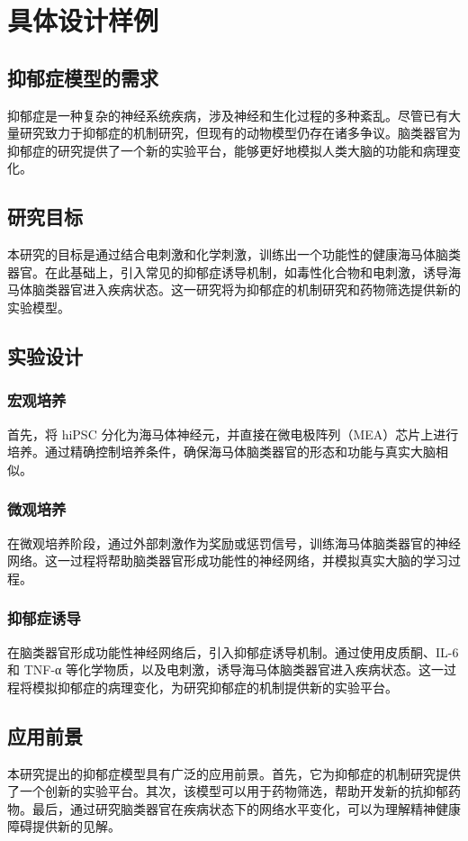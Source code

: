 \chapter{具体设计样例}\label{chap:design}

\section{抑郁症模型的需求}\label{sec:depression-model-requirement}
抑郁症是一种复杂的神经系统疾病，涉及神经和生化过程的多种紊乱。尽管已有大量研究致力于抑郁症的机制研究，但现有的动物模型仍存在诸多争议。脑类器官为抑郁症的研究提供了一个新的实验平台，能够更好地模拟人类大脑的功能和病理变化。

\section{研究目标}\label{sec:research-objective}
本研究的目标是通过结合电刺激和化学刺激，训练出一个功能性的健康海马体脑类器官。在此基础上，引入常见的抑郁症诱导机制，如毒性化合物和电刺激，诱导海马体脑类器官进入疾病状态。这一研究将为抑郁症的机制研究和药物筛选提供新的实验模型。

\section{实验设计}\label{sec:experiment-design}
\subsection{宏观培养}\label{subsec:macro-culture}
首先，将 hiPSC 分化为海马体神经元，并直接在微电极阵列（MEA）芯片上进行培养。通过精确控制培养条件，确保海马体脑类器官的形态和功能与真实大脑相似。

\subsection{微观培养}\label{subsec:micro-culture}
在微观培养阶段，通过外部刺激作为奖励或惩罚信号，训练海马体脑类器官的神经网络。这一过程将帮助脑类器官形成功能性的神经网络，并模拟真实大脑的学习过程。

\subsection{抑郁症诱导}\label{subsec:depression-induction}
在脑类器官形成功能性神经网络后，引入抑郁症诱导机制。通过使用皮质酮、IL-6 和 TNF-α 等化学物质，以及电刺激，诱导海马体脑类器官进入疾病状态。这一过程将模拟抑郁症的病理变化，为研究抑郁症的机制提供新的实验平台。

\section{应用前景}\label{sec:application-prospect}
本研究提出的抑郁症模型具有广泛的应用前景。首先，它为抑郁症的机制研究提供了一个创新的实验平台。其次，该模型可以用于药物筛选，帮助开发新的抗抑郁药物。最后，通过研究脑类器官在疾病状态下的网络水平变化，可以为理解精神健康障碍提供新的见解。

